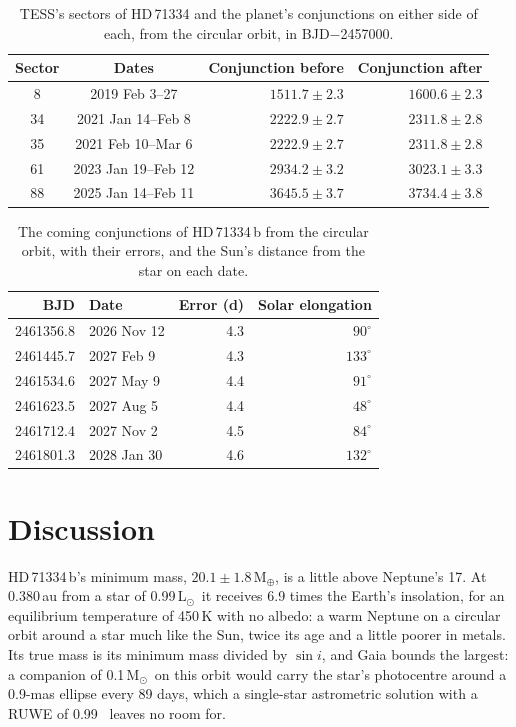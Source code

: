 \documentclass[3p,11pt]{elsarticle}
\newcommand{\Msun}{M$_\odot$}
\newcommand{\Lsun}{L$_\odot$}
\newcommand{\Mearth}{M$_\oplus$}
\begin{document}
\begin{table}[!htbp]
\centering
\caption{TESS's sectors of HD\,71334 and the planet's conjunctions on either side of each, from the
circular orbit, in BJD$-$2457000.}\label{tab:tess}
\begin{tabular}{c c r r}
\toprule
Sector & Dates & Conjunction before & Conjunction after \\
\midrule
8 & 2019 Feb 3--27 & $1511.7 \pm 2.3$ & $1600.6 \pm 2.3$ \\
34 & 2021 Jan 14--Feb 8 & $2222.9 \pm 2.7$ & $2311.8 \pm 2.8$ \\
35 & 2021 Feb 10--Mar 6 & $2222.9 \pm 2.7$ & $2311.8 \pm 2.8$ \\
61 & 2023 Jan 19--Feb 12 & $2934.2 \pm 3.2$ & $3023.1 \pm 3.3$ \\
88 & 2025 Jan 14--Feb 11 & $3645.5 \pm 3.7$ & $3734.4 \pm 3.8$ \\
\bottomrule
\end{tabular}
\end{table}

\begin{table}[!htbp]
\centering
\caption{The coming conjunctions of HD\,71334\,b from the circular orbit, with their errors, and the
Sun's distance from the star on each date.}\label{tab:conjunctions}
\begin{tabular}{r l r r}
\toprule
BJD & Date & Error (d) & Solar elongation \\
\midrule
2461356.8 & 2026 Nov 12 & 4.3 & $90^\circ$ \\
2461445.7 & 2027 Feb 9 & 4.3 & $133^\circ$ \\
2461534.6 & 2027 May 9 & 4.4 & $91^\circ$ \\
2461623.5 & 2027 Aug 5 & 4.4 & $48^\circ$ \\
2461712.4 & 2027 Nov 2 & 4.5 & $84^\circ$ \\
2461801.3 & 2028 Jan 30 & 4.6 & $132^\circ$ \\
\bottomrule
\end{tabular}
\end{table}

\section{Discussion}\label{sec:discussion}

HD\,71334\,b's minimum mass, $20.1 \pm 1.8$\,\Mearth, is a little above Neptune's 17. At 0.380\,au from
a star of 0.99\,\Lsun\ it receives 6.9 times the Earth's insolation, for an equilibrium temperature of
450\,K with no albedo: a warm Neptune on a circular orbit around a star much like the Sun, twice its age
and a little poorer in metals. Its true mass is its minimum mass divided by $\sin i$, and Gaia bounds the
largest: a companion of 0.1\,\Msun\ on this orbit would carry the star's photocentre around a 0.9-mas
ellipse every 89 days, which a single-star astrometric solution with a RUWE of 0.99~\cite{Lindegren2021}
leaves no room for.
\end{document}

